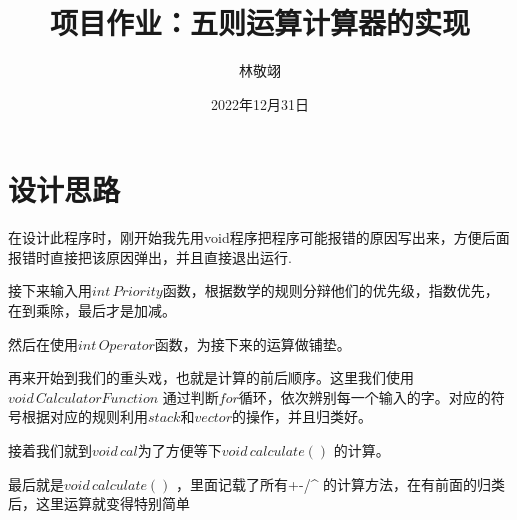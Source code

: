 \documentclass{article}
\title{项目作业：五则运算计算器的实现}
\author{林敬翊}
\date{2022年12月31日}
\begin{document}
\maketitle

\section{设计思路}
在设计此程序时，刚开始我先用void程序把程序可能报错的原因写出来，方便后面报错时直接把该原因弹出，并且直接退出运行.\par
接下来输入用$int\,Priority$函数，根据数学的规则分辩他们的优先级，指数优先，在到乘除，最后才是加减。 \par
然后在使用$int\,Operator$函数，为接下来的运算做铺垫。\par
再来开始到我们的重头戏，也就是计算的前后顺序。这里我们使用$void\,CalculatorFunction$ 通过判断$for$循环，依次辨别每一个输入的字。对应的符号根据对应的规则利用$stack$和$vector$的操作，并且归类好。 \par
接着我们就到$void\,cal$为了方便等下$void\,calculate()$ 的计算。\par
最后就是$void\,calculate()$ ，里面记载了所有+\quad-\quad*\quad/\quad \^{} 的计算方法，在有前面的归类后，这里运算就变得特别简单
\end{document}
